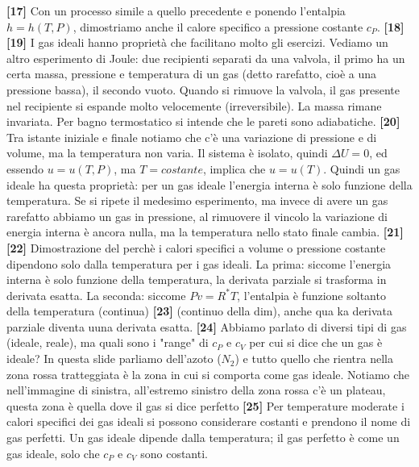 \newline\textbf{[17]}\; Con un processo simile a quello precedente e ponendo l'entalpia $h = h(T,P)$, dimostriamo anche il calore specifico a pressione costante $c_P$.
\newline\textbf{[18]}\;
\newline\textbf{[19]}\; I gas ideali hanno proprietà che facilitano molto gli esercizi. Vediamo un altro esperimento di Joule: due recipienti separati da una valvola, il primo ha un certa massa, pressione e temperatura di un gas (detto rarefatto, cioè a una pressione bassa), il secondo vuoto. Quando si rimuove la valvola, il gas presente nel recipiente si espande molto velocemente (irreversibile). La massa rimane invariata. Per bagno termostatico si intende che le pareti sono adiabatiche. 
\newline\textbf{[20]}\; Tra istante iniziale e finale notiamo che c'è una variazione di pressione e di volume, ma la temperatura non varia. Il sistema è isolato, quindi $\Delta U = 0$, ed essendo $u = u(T,P)$, ma $T = costante$, implica che $u = u(T)$. Quindi un gas ideale ha questa proprietà: per un gas ideale l'energia interna è solo funzione della temperatura. Se si ripete il medesimo esperimento, ma invece di avere un gas rarefatto abbiamo un gas in pressione, al rimuovere il vincolo la variazione di energia interna è ancora nulla, ma la temperatura nello stato finale cambia. 
\newline\textbf{[21]}\;
\newline\textbf{[22]}\; Dimostrazione del perchè i calori specifici a volume o pressione costante dipendono solo dalla temperatura per i gas ideali. La prima: siccome l'energia interna è solo funzione della temperatura, la derivata parziale si trasforma in derivata esatta. La seconda: siccome $Pv = R^* T$, l'entalpia è funzione soltanto della temperatura (continua)
\newline\textbf{[23]}\; (continuo della dim), anche qua ka derivata parziale diventa uuna derivata esatta.
\newline\textbf{[24]}\; Abbiamo parlato di diversi tipi di gas (ideale, reale), ma quali sono i "range" di $c_P$ e $c_V$ per cui si dice che un gas è ideale? In questa slide parliamo dell'azoto ($N_2$) e tutto quello che rientra nella zona rossa tratteggiata è la zona in cui si comporta come gas ideale. Notiamo che nell'immagine di sinistra, all'estremo sinistro della zona rossa c'è un plateau, questa zona è quella dove il gas si dice perfetto
\newline\textbf{[25]}\; Per temperature moderate i calori specifici dei gas ideali si possono considerare costanti e prendono il nome di gas perfetti. Un gas ideale dipende dalla temperatura; il gas perfetto è come un gas ideale, solo che $c_P$ e $c_V$ sono costanti. 
